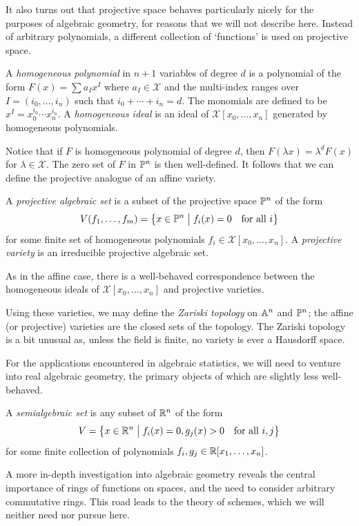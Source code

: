 \documentclass[cclicense]{hmcthesis}
\newcommand*{\F}{\mathcal{X}}
\newcommand*{\vbar}{\;\big\vert\;}
\numberwithin{equation}{chapter}
\numberwithin{thmcounter}{chapter}
\begin{document}
    It also turns out that projective space behaves particularly nicely for the
    purposes of algebraic geometry, for reasons that we will not describe here.
    Instead of arbitrary polynomials, a different collection of `functions' is
    used on projective space.
    \begin{definition}
        A \emph{homogeneous polynomial} in $n+1$ variables of degree $d$ is a
        polynomial of the form $F(x) = \sum a_I x^I$ where $a_I \in \F$ and the
        multi-index ranges over $I = (i_0, \ldots, i_n)$ such that $i_0 + \cdots
        + i_n = d$.  The monomials are defined to be $x^I = x_0^{i_0}\cdots
        x_n^{i_n}$.  A \emph{homogeneous ideal} is an ideal of $\F[x_0, \ldots,
        x_n]$ generated by homogeneous polynomials.
    \end{definition}
    Notice that if $F$ is homogeneous polynomial of degree $d$, then $F(\lambda
    x) = \lambda^d F(x)$ for $\lambda \in \F$.  The zero set of $F$ in $\mathbb{P}^n$
    is then well-defined.  It follows that we can define the projective analogue
    of an affine variety.
    \begin{definition}
        A \emph{projective algebraic set} is a subset of the projective space
        $\mathbb{P}^n$ of the form
        \[
            V(f_1, \ldots, f_m)
            = \cdel[\big]{x \in \Proj^n \vbar f_i(x) = 0 \quad\text{for all $i$}}
        \]
        for some finite set of homogeneous polynomials $f_i \in \F[x_0,
        \ldots,x_n]$.  A \emph{projective variety} is an irreducible projective
        algebraic set.
    \end{definition}
    As in the affine case, there is a well-behaved correspondence between the
    homogeneous ideals of $\F[x_0, \ldots, x_n]$ and projective varieties.

    Using these varieties, we may define the \emph{Zariski topology} on $\mathbb{A}^n$
    and $\mathbb{P}^n$;  the affine (or projective) varieties are the closed sets of
    the topology.  The Zariski topology is a bit unusual as, unless the field is
    finite, no variety is ever a Hausdorff space.

    For the applications encountered in algebraic statistics, we will need to
    venture into real algebraic geometry, the primary objects of which are
    slightly less well-behaved.
    \begin{definition}
        A \emph{semialgebraic set} is any subset of $\mathbb{R}^n$ of the form
        \[
            V = \cdel[\big]{ x \in \R^n \vbar
                f_i(x) = 0, g_j(x) > 0
            \quad\text{for all $i,j$}}
        \]
        for some finite collection of polynomials $f_i, g_j \in \mathbb{R}[x_1, \ldots,
        x_n]$.
    \end{definition}

    A more in-depth investigation into algebraic geometry reveals the central
    importance of rings of functions on spaces, and the need to consider
    arbitrary commutative rings.  This road leads to the theory of schemes,
    which we will neither need nor pursue here.


\backmatter




\printindex
\end{document}
